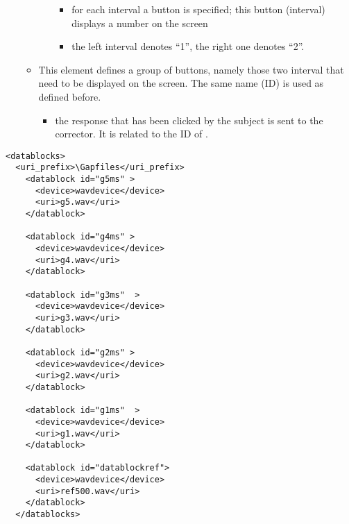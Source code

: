 \begin{itemize}
\begin{itemize}
\begin{itemize}
\begin{itemize}
\item {} for each interval a button is specified;
this button (interval) displays a number on the screen

\item {} the left interval denotes ``1'', the right
one denotes ``2''.

\end{itemize}
\end{itemize}

\item {} This element defines a group of
buttons, namely those two interval that need to be displayed on
the screen. The same name (ID) is used as defined before.

\begin{itemize}
\item {} the response that has been
clicked by the subject is sent to the corrector. It is related to
the ID of .

\end{itemize}
\end{itemize}
\end{itemize}












\begin{lstlisting}
<datablocks>
  <uri_prefix>\Gapfiles</uri_prefix>
    <datablock id="g5ms" >
      <device>wavdevice</device>
      <uri>g5.wav</uri>
    </datablock>

    <datablock id="g4ms" >
      <device>wavdevice</device>
      <uri>g4.wav</uri>
    </datablock>

    <datablock id="g3ms"  >
      <device>wavdevice</device>
      <uri>g3.wav</uri>
    </datablock>

    <datablock id="g2ms" >
      <device>wavdevice</device>
      <uri>g2.wav</uri>
    </datablock>

    <datablock id="g1ms"  >
      <device>wavdevice</device>
      <uri>g1.wav</uri>
    </datablock>

    <datablock id="datablockref">
      <device>wavdevice</device>
      <uri>ref500.wav</uri>
    </datablock>
  </datablocks>
\end{lstlisting}


